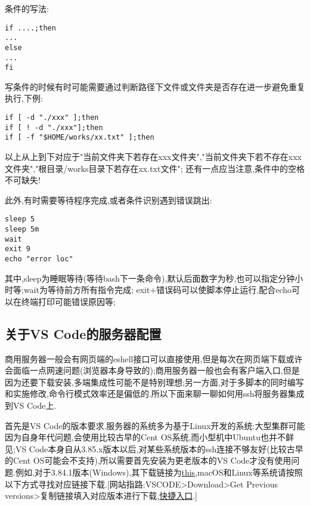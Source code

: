 条件的写法:\par
\begin{lstlisting}[frame=single]
if ....;then
...
else
...
fi
\end{lstlisting}
\par

写条件的时候有时可能需要通过判断路径下文件或文件夹是否存在进一步避免重复执行,下例:

\begin{lstlisting}[frame=single]
if [ -d "./xxx" ];then
if [ ! -d "./xxx"];then
if [ -f "$HOME/works/xx.txt" ];then
\end{lstlisting}
\par
以上从上到下对应于"当前文件夹下若存在xxx文件夹","当前文件夹下若不存在xxx文件夹","根目录/works目录下若存在xx.txt文件"; 还有一点应当注意,条件中的空格不可缺失!\par

此外,有时需要等待程序完成,或者条件识别遇到错误跳出:\par

\begin{lstlisting}[frame=single]
sleep 5
sleep 5m
wait
exit 9
echo "error loc"
\end{lstlisting}
\par

其中,sleep为睡眠等待(等待bash下一条命令),默认后面数字为秒,也可以指定分钟小时等;wait为等待前方所有指令完成; exit+错误码可以使脚本停止运行,配合echo可以在终端打印可能错误原因等;


\subsection{关于VS Code的服务器配置}
商用服务器一般会有网页端的eshell接口可以直接使用,但是每次在网页端下载或许会面临一点网速问题(浏览器本身导致的);商用服务器一般也会有客户端入口,但是因为还要下载安装,多端集成性可能不是特别理想;另一方面,对于多脚本的同时编写和实施修改,命令行模式效率还是偏低的.所以下面来聊一聊如何用ssh将服务器集成到VS Code上.\par


首先是VS Code的版本要求.服务器的系统多为基于Linux开发的系统:大型集群可能因为自身年代问题,会使用比较古早的Cent OS系统,而小型机中Ubuntu也并不鲜见;VS Code本身自从3.85.x版本以后,对某些系统版本的ssh连接不够友好(比较古早的Cent OS可能会不支持),所以需要首先安装为更老版本的VS Code才没有使用问题.例如,对于3.84.1版本(Windows),其下载链接为\href{https://update.code.visualstudio.com/3.84.1/win32-x64/stable}{this},macOS和Linux等系统请按照以下方式寻找对应链接下载.[网站指路:VSCODE>Download>Get Previous versions>复制链接填入对应版本进行下载,\href{https://code.visualstudio.com/docs/supporting/faq#_previous-release-versions}{快捷入口}.]\par

